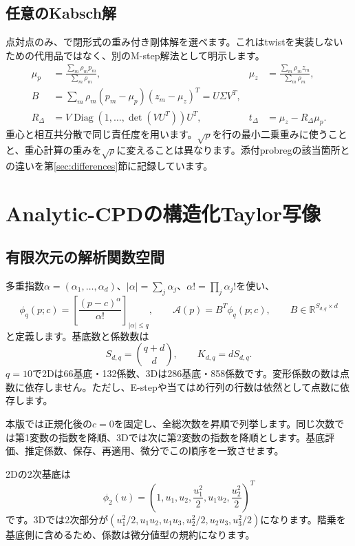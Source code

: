 \documentclass[a4paper,11pt]{article}
\newcommand{\R}{\mathbb{R}}
\newcommand{\diag}{\operatorname{Diag}}
\newcommand{\code}[1]{\texttt{\detokenize{#1}}}
\numberwithin{equation}{section}
\begin{document}
\subsection{任意のKabsch解}
点対点のみ、\code{solver="kabsch"}で閉形式の重み付き剛体解を選べます。これはtwistを実装しないための代用品ではなく、別のM-step解法として明示します。
\begin{align}
 \mu_p&=\frac{\sum_m\rho_mp_m}{\sum_m\rho_m},&
 \mu_z&=\frac{\sum_m\rho_mz_m}{\sum_m\rho_m},\\
 B&=\sum_m\rho_m(p_m-\mu_p)(z_m-\mu_z)^T=U\Sigma V^T,\\
 R_\Delta&=V\diag(1,\ldots,\det(VU^T))U^T,&
 t_\Delta&=\mu_z-R_\Delta\mu_p.
\end{align}
重心と相互共分散で同じ責任度を用います。\(\sqrt{\rho}\)を行の最小二乗重みに使うことと、重心計算の重みを\(\sqrt{\rho}\)に変えることは異なります。添付probregの該当箇所との違いを第\ref{sec:differences}節に記録しています。

\section{Analytic-CPDの構造化Taylor写像}\label{sec:taylor}
\subsection{有限次元の解析関数空間}
多重指数\(\alpha=(\alpha_1,\ldots,\alpha_d)\)、\(|\alpha|=\sum_j\alpha_j\)、\(\alpha!=\prod_j\alpha_j!\)を使い、
\begin{equation}
 \phi_q(p;c)=\left[\frac{(p-c)^\alpha}{\alpha!}\right]_{|\alpha|\leq q},\qquad
 \mathcal A(p)=B^T\phi_q(p;c),\qquad B\in\R^{S_{d,q}\times d}
\end{equation}
と定義します。基底数と係数数は
\begin{equation}
 S_{d,q}=\binom{q+d}{d},\qquad K_{d,q}=dS_{d,q}.
\end{equation}
\(q=10\)で2Dは66基底・132係数、3Dは286基底・858係数です。変形係数の数は点数に依存しません。ただし、E-stepや当てはめ行列の行数は依然として点数に依存します。\cite[§3.4、付録A]{acpd}

本版では正規化後の\(c=0\)を固定し、全総次数を昇順で列挙します。同じ次数では第1変数の指数を降順、3Dでは次に第2変数の指数を降順とします。基底評価、推定係数、保存、再適用、微分でこの順序を一致させます。

2Dの2次基底は
\begin{equation}
 \phi_2(u)=\left(1,u_1,u_2,\frac{u_1^2}{2},u_1u_2,\frac{u_2^2}{2}\right)^T
\end{equation}
です。3Dでは2次部分が\((u_1^2/2,u_1u_2,u_1u_3,u_2^2/2,u_2u_3,u_3^2/2)\)になります。階乗を基底側に含めるため、係数は微分値型の規約になります。
\end{document}
